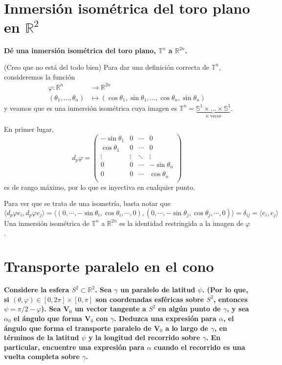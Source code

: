 \documentclass[11pt]{article}
\theoremstyle{definition}
\begin{document}
\section*{Inmersión isométrica del toro plano en $\mathbb R^2$}
\textbf{Dé una inmersión isométrica del toro plano, $\mathbb{T}^n$ a $\mathbb{R}^{2n}$.}\par
(Creo que no está del todo bien) Para dar una definición correcta de $\mathbb{T}^n$, consideremos la función 
\begin{align*}
\varphi:\mathbb{R}^n&\longrightarrow\mathbb{R}^{2n}\\(\theta_1,...,\theta_n)&\mapsto(\cos{\theta_1},\sin{\theta_1},...,\cos{\theta_n},\sin{\theta_n})
\end{align*}
y veamos que es una inmersión isométrica cuya imagen es $\mathbb{T}^n=\underbrace{\mathbb{S}^1\times...\times\mathbb{S}^1}_{n\text{ veces}}$.\par
En primer lugar,
\begin{equation*}
    d_p\varphi =
\begin{pmatrix}
-\sin{\theta_1}& 0&\cdots&0\\
\cos{\theta_1}&0&\cdots&0\\
\vdots&\vdots&\ddots&\vdots\\
0&0&\cdots&-\sin{\theta_n}\\
0&0&\cdots&\cos{\theta_n}\\
\end{pmatrix}
\end{equation*}
es de rango máximo, por lo que es inyectiva en cualquier punto.\par
Para ver que se trata de una isometría, basta notar que
$$\langle d_p\varphi e_i,d_p\varphi e_j\rangle=\langle (0,\cdots, -\sin{\theta_i},\cos{\theta_i},\cdots,0),(0,\cdots,-\sin{\theta_j},\cos{\theta_j},\cdots,0)\rangle=\delta_{ij}=\langle e_i,e_j\rangle$$
Una inmersión isométrica de $\mathbb{T}^n$ a $\mathbb{R}^{2n}$ es la identidad restringida a la imagen de $\varphi$.

\newpage
\section*{Transporte paralelo en el cono}
\textbf{Considere la esfera $S^2\subset\mathbb{R}^2$. Sea $\gamma$ un paralelo de latitud $\psi$. (Por lo que, si $(\theta,\varphi)\in[0,2\pi]\times[0,\pi]$ son coordenadas esféricas sobre $S^2$, entonces $\psi=\pi/2-\varphi$). Sea $\mathbf{V}_0$ un vector tangente a $S^2$ en algún punto de $\gamma$, y sea $\alpha_0$ el ángulo que forma $\mathbf{V}_0$ con $\gamma$. Deduzca una expresión para $\alpha$, el ángulo que forma el transporte paralelo de $\mathbf{V}_0$ a lo largo de $\gamma$, en términos de la latitud $\psi$ y la longitud del recorrido sobre $\gamma$. En particular, encuentre una expresión para $\alpha$ cuando el recorrido es una vuelta completa sobre $\gamma$.}\par
\end{document}
